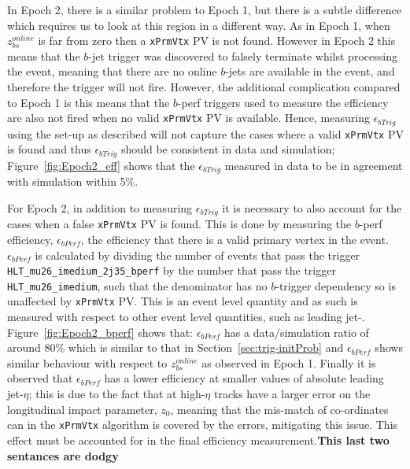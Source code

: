 In Epoch 2, there is a similar problem to Epoch 1, but there is a subtle difference which requires us to look at this region in a
different way.
As in Epoch 1, when  $z_{bs}^{online}$ is far from zero then a \verb|xPrmVtx| PV is not found.
However in Epoch 2 this means that the  $b$-jet trigger was discovered to falsely terminate whilst processing the event,
meaning that there are no online $b$-jets are available in the event, and therefore the trigger will not fire.
However, the additional complication compared to Epoch 1 is this means that the  $b$-perf triggers used to measure the efficiency
are also not fired when no valid \verb|xPrmVtx| PV is available.
Hence, measuring $\epsilon_{bTrig}$ using the set-up as described will not capture the cases where a valid \verb|xPrmVtx| PV is found
and thus $\epsilon_{bTrig}$ should be consistent in data and simulation;
Figure~\ref{fig:Epoch2_eff} shows that the $\epsilon_{bTrig}$ measured in data to be in agreement with simulation within 5\%.


For Epoch 2, in addition to measuring $\epsilon_{bTrig}$ it is necessary
to also account for the cases when a false \verb|xPrmVtx| PV is found.
This is done by measuring the $b$-perf efficiency, $\epsilon_{bPerf}$,
the efficiency that there is a valid primary vertex in the event.
$\epsilon_{bPerf}$ is calculated by dividing the number of events that pass the trigger
\verb|HLT_mu26_imedium_2j35_bperf| by the number that pass the trigger \verb|HLT_mu26_imedium|,
such that the denominator has no $b$-trigger dependency so is unaffected by \verb|xPrmVtx| PV.
This is an event level quantity and as such is measured with respect to other event level quantities, such as leading jet-\pT.
Figure~\ref{fig:Epoch2_bperf} shows that:
$\epsilon_{bPerf}$ has a data/simulation ratio of around 80\%  which is similar to that in Section~\ref{sec:trig-initProb} and
$\epsilon_{bPerf}$ shows similar behaviour with respect to  $z_{bs}^{online}$ as observed in Epoch 1.
Finally it is observed that $\epsilon_{bPerf}$ has a lower efficiency at smaller values of absolute leading jet-$\eta$;
this is due to the fact that at high-$\eta$ tracks have a larger error on the longitudinal impact parameter, $z_0$,
meaning that the mis-match of co-ordinates can in the \verb|xPrmVtx| algorithm is covered by the errors, mitigating this issue.
This effect must be accounted for in the final efficiency measurement.\textbf{This last two sentances are dodgy}

